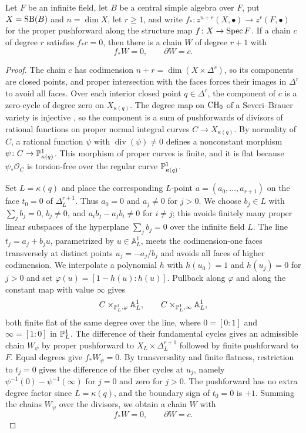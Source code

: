 \begin{lemma}\label{lem:paper-structural-boundary-correction}
Let $F$ be an infinite field, let $B$ be a central simple algebra over $F$, put $X=\operatorname{SB}(B)$ and $n=\dim X$, let $r\ge1$, and write $f_*\colon z^{n+r}(X,\bullet)\to z^r(F,\bullet)$ for the proper pushforward along the structure map $f\colon X\to\operatorname{Spec} F$.
If a chain $c$ of degree $r$ satisfies $f_*c=0$, then there is a chain $W$ of degree $r+1$ with
\[
 f_*W=0,\qquad\partial W=c.
\]
\end{lemma}
\begin{proof}
The chain $c$ has codimension $n+r=\dim(X\times\Delta^r)$, so its components are closed points, and proper intersection with the faces forces their images in $\Delta^r$ to avoid all faces.
Over each interior closed point $q\in\Delta^r$, the component of $c$ is a zero-cycle of degree zero on $X_{\kappa(q)}$.
The degree map on $\operatorname{CH}_0$ of a Severi--Brauer variety is injective \cite[Corollary 7.3]{ChernousovMerkurjev2006}, so the component is a sum of pushforwards of divisors of rational functions on proper normal integral curves $C\to X_{\kappa(q)}$.
By normality of $C$, a rational function $\psi$ with $\operatorname{div}(\psi)\ne0$ defines a nonconstant morphism $\psi\colon C\to\mathbb P^1_{\kappa(q)}$.
This morphism of proper curves is finite, and it is flat because $\psi_*\mathcal O_C$ is torsion-free over the regular curve $\mathbb P^1_{\kappa(q)}$.

Set $L=\kappa(q)$ and place the corresponding $L$-point $a=(a_0,\ldots,a_{r+1})$ on the face $t_0=0$ of $\Delta^{r+1}_L$.
Thus $a_0=0$ and $a_j\ne0$ for $j>0$.
We choose $b_j\in L$ with $\sum_j b_j=0$, $b_j\ne0$, and $a_i b_j-a_j b_i\ne0$ for $i\ne j$; this avoids finitely many proper linear subspaces of the hyperplane $\sum_jb_j=0$ over the infinite field $L$.
The line $t_j=a_j+b_j u$, parametrized by $u\in\mathbb A^1_L$, meets the codimension-one faces transversely at distinct points $u_j=-a_j/b_j$ and avoids all faces of higher codimension.
We interpolate a polynomial $h$ with $h(u_0)=1$ and $h(u_j)=0$ for $j>0$ and set $\varphi(u)=[1-h(u):h(u)]$.
Pullback along $\varphi$ and along the constant map with value $\infty$ gives
\[
 C\times_{\mathbb P^1_L,\varphi}\mathbb A^1_L,\qquad
 C\times_{\mathbb P^1_L,\infty}\mathbb A^1_L,
\]
both finite flat of the same degree over the line, where $0=[0:1]$ and $\infty=[1:0]$ in $\mathbb P^1_L$.
The difference of their fundamental cycles gives an admissible chain $W_\psi$ by proper pushforward to $X_L\times\Delta^{r+1}_L$ followed by finite pushforward to $F$.
Equal degrees give $f_*W_\psi=0$.
By transversality and finite flatness, restriction to $t_j=0$ gives the difference of the fiber cycles at $u_j$, namely $\psi^{-1}(0)-\psi^{-1}(\infty)$ for $j=0$ and zero for $j>0$.
The pushforward has no extra degree factor since $L=\kappa(q)$, and the boundary sign of $t_0=0$ is $+1$.
Summing the chains $W_\psi$ over the divisors, we obtain a chain $W$ with
\[
 f_*W=0,\qquad\partial W=c.
\]
\end{proof}

